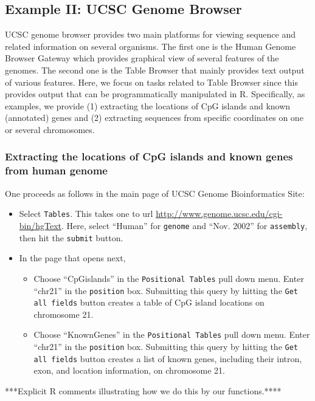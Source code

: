 \documentclass[notitlepage,11pt]{article}
\begin{document}
\subsection{Example II: UCSC Genome Browser} \label{humangenome}

UCSC genome browser provides two main platforms for viewing sequence and related information on several organisms.
The first one is the Human Genome Browser Gateway which provides graphical view of several features of the genomes.
The second one is the Table Browser that mainly provides text output of various features.
Here, we focus on tasks related to Table Browser since this provides output that can be programmatically manipulated in R.
Specifically, as examples, we provide (1) extracting the locations of CpG islands and  known (annotated) genes and (2) extracting  
sequences from specific coordinates on one or several chromosomes.


\subsubsection{Extracting the locations of CpG islands and  known genes  from human genome}
One proceeds as follows in the main page of UCSC Genome Bioinformatics Site:
\begin{itemize}
\item Select \texttt{Tables}. This takes one to  url \url{http://www.genome.ucsc.edu/cgi-bin/hgText}. 
Here, select ``Human'' for \texttt{genome} and ``Nov. 2002'' for \texttt{assembly}, then hit the \texttt{submit} button.
\item In the page that opens next,
\begin{itemize}
\item Choose ``CpGislands''  in the \texttt{Positional Tables} pull down menu. Enter ``chr21'' in the \texttt{position} box. 
Submitting this query by hitting the \texttt{Get all fields} button  creates a table of CpG island locations on chromosome 21.
\item Choose ``KnownGenes'' in the \texttt{Positional Tables} pull down menu. Enter ``chr21'' in the \texttt{position} box.  
Submitting this query by hitting the \texttt{Get all fields} button  creates a list of known genes, including their intron, exon, and location  information,  on chromosome 21.
\end{itemize}
\end{itemize}

***Explicit R comments illustrating how we do this by our functions.****
\end{document}
